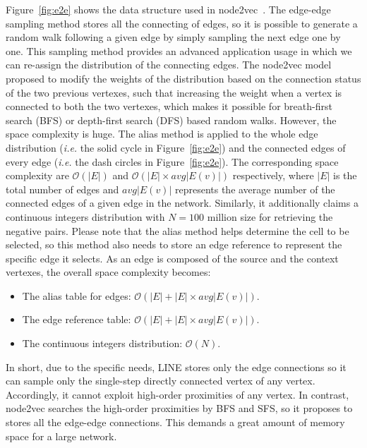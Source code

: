 Figure~\ref{fig:e2e} shows the data structure used in node2vec~\cite{n2v}. The edge-edge sampling method stores all the connecting of edges, so it is possible to generate a random walk following a given edge by simply sampling the next edge one by one. This sampling method provides an advanced application usage in which we can re-assign the distribution of the connecting edges. The node2vec model proposed to modify the weights of the distribution based on the connection status of the two previous vertexes, such that increasing the weight when a vertex is connected to both the two vertexes, which makes it possible for breath-first search (BFS) or depth-first search (DFS) based random walks. However, the space complexity is huge.  The alias method is applied to the whole edge distribution (\textit{i.e.} the solid cycle in Figure~\ref{fig:e2e}) and the connected edges of every edge (\textit{i.e.} the dash circles in Figure~\ref{fig:e2e}).
The corresponding space complexity are $\mathcal{O}(|E|)$ and $\mathcal{O}(|E|\times avg|E(v)|)$ respectively, where $|E|$ is the total number of edges and $avg|E(v)|$ represents the average number of the connected edges of a given edge in the network.  Similarly, it additionally claims a continuous integers distribution with $N=100$ million size for retrieving the negative pairs. Please note that the alias method helps determine the cell to be selected, so this method also needs to store an edge reference to represent the specific edge it selects.  As an edge is composed of the source and the context vertexes, the overall space complexity becomes:
\begin{itemize}
  \item The alias table for edges: $\mathcal{O}(|E|+|E|\times avg|E(v)|)$.
  \item The edge reference table: $\mathcal{O}(|E|+|E|\times avg|E(v)|)$.
  \item The continuous integers distribution: $\mathcal{O}(N)$.
\end{itemize}

In short, due to the specific needs, LINE stores only the edge connections so it can sample only the single-step directly connected vertex of any vertex. Accordingly, it cannot exploit high-order proximities of any vertex. In contrast, node2vec searches the high-order proximities by BFS and SFS, so it proposes to stores all the edge-edge connections. This demands a great amount of memory space for a large network. 

